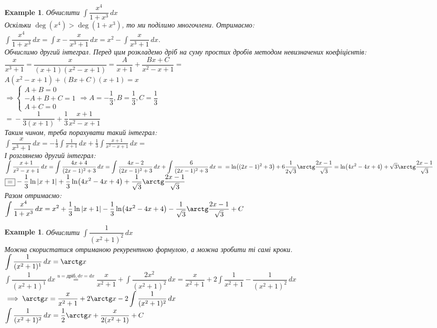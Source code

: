 \documentclass[a4paper, 10pt]{article}
\def\huge{\displaystyle}
\theoremstyle{theoremdd}
\theoremstyle{theoremdd}
\theoremstyle{theoremdd}
\theoremstyle{theoremdd}
\newtheorem{example}[theorem]{Example}
\theoremstyle{theoremdd}
\theoremstyle{theoremdd}
\theoremstyle{theoremdd}
\theoremstyle{theoremdd}
\begin{document}
\begin{example}
Обчислити $\huge \int \dfrac{x^4}{1+x^3}\,dx$\\
Оскільки $\deg(x^4) > \deg(1+x^3)$, то ми поділимо многочлени. Отримаємо:\\
$\huge \int \dfrac{x^4}{1+x^3}\,dx = \int x - \dfrac{x}{x^3+1}\,dx = x^2 - \int \dfrac{x}{x^3+1}\,dx$.\\
Обчислимо другий інтеграл. Перед цим розкладемо дріб на суму простих дробів методом невизначених коефіцієнтів:\\
$\dfrac{x}{x^3+1} = \dfrac{x}{(x+1)(x^2-x+1)} = \dfrac{A}{x+1} + \dfrac{Bx+C}{x^2-x+1} \boxed{=}$\\
$A(x^2-x+1) + (Bx+C)(x+1) = x$\\
$\Rightarrow \begin{cases}
A + B = 0 \\
-A + B + C = 1\\
A + C = 0
\end{cases} \Rightarrow A = -\dfrac{1}{3}, B = \dfrac{1}{3}, C = \dfrac{1}{3}$\\
$\boxed{=} -\dfrac{1}{3(x+1)} + \dfrac{1}{3} \dfrac{x+1}{x^2-x+1}$\\
Таким чином, треба порахувати такий інтеграл:\\
$\huge \int \dfrac{x}{x^3+1}\,dx = -\frac{1}{3} \int \frac{1}{x+1}\,dx + \frac{1}{3} \int \frac{x+1}{x^2-x+1}\,dx \boxed{=}$\\
І розглянемо другий інтеграл:\\
$\huge \int \frac{x+1}{x^2-x+1}\,dx = \int \frac{4x+4}{(2x-1)^2 + 3}\,dx = \int \frac{4x-2}{(2x-1)^2 +3}\,dx + \int \frac{6}{(2x-1)^2 +3}\,dx = \\ = \ln((2x-1)^2+3) + 6 \dfrac{1}{2\sqrt{3}} \arctg \dfrac{2x-1}{\sqrt{3}} = \ln(4x^2-4x+4) + \sqrt{3} \arctg \dfrac{2x-1}{\sqrt{3}}$\\
$\boxed{=} \huge -\dfrac{1}{3} \ln|x+1| + \dfrac{1}{3} \ln(4x^2-4x+4) + \dfrac{1}{\sqrt{3}} \arctg \dfrac{2x-1}{\sqrt{3}}$\\
Разом отримаємо:\\
$\huge \int \dfrac{x^4}{1+x^3}\,dx = x^2 + \dfrac{1}{3} \ln|x+1| - \dfrac{1}{3} \ln(4x^2-4x+4) - \dfrac{1}{\sqrt{3}} \arctg \dfrac{2x-1}{\sqrt{3}} + C$
\end{example}

\begin{example}
Обчислити $\huge\int \dfrac{1}{(x^2+1)^2}\,dx$\\
Можна скористатися отриманою рекурентною формулою, а можна зробити ті самі кроки.\\
$\huge \int \dfrac{1}{(x^2+1)^1}\,dx = \arctg x$\\
$\huge \int \dfrac{1}{(x^2+1)^1}\,dx \overset{u=\text{дріб}, dv = dx}{=} \dfrac{x}{x^2+1} + \int \dfrac{2x^2}{(x^2+1)^2}\,dx = \dfrac{x}{x^2+1} + 2\int \dfrac{1}{x^2+1} - \dfrac{1}{(x^2+1)^2}\,dx$\\
$\implies \huge \arctg x = \dfrac{x}{x^2+1} + 2\arctg x - 2 \int \dfrac{1}{(x^2+1)^2}\,dx$\\
$\huge\int \dfrac{1}{(x^2+1)^2}\,dx = \dfrac{1}{2} \arctg x + \dfrac{x}{2(x^2+1)} + C$
\end{example}
\end{document}
